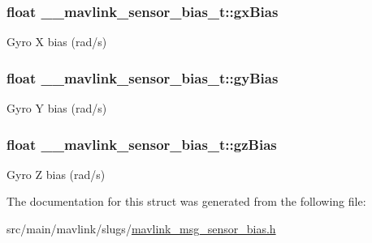 \hypertarget{struct____mavlink__sensor__bias__t_ad312d14ec67a812646702cb1af26e0a5}{
\subsubsection[{gx\+Bias}]{\setlength{\rightskip}{0pt plus 5cm}float \+\_\+\+\_\+mavlink\+\_\+sensor\+\_\+bias\+\_\+t\+::gx\+Bias}}\label{struct____mavlink__sensor__bias__t_ad312d14ec67a812646702cb1af26e0a5}


Gyro X bias (rad/s) 

\hypertarget{struct____mavlink__sensor__bias__t_a3c59d214cf6af8a1b0a7cfc38e593995}{
\subsubsection[{gy\+Bias}]{\setlength{\rightskip}{0pt plus 5cm}float \+\_\+\+\_\+mavlink\+\_\+sensor\+\_\+bias\+\_\+t\+::gy\+Bias}}\label{struct____mavlink__sensor__bias__t_a3c59d214cf6af8a1b0a7cfc38e593995}


Gyro Y bias (rad/s) 

\hypertarget{struct____mavlink__sensor__bias__t_af1973e90edcb27370fa54d23b6d56b10}{
\subsubsection[{gz\+Bias}]{\setlength{\rightskip}{0pt plus 5cm}float \+\_\+\+\_\+mavlink\+\_\+sensor\+\_\+bias\+\_\+t\+::gz\+Bias}}\label{struct____mavlink__sensor__bias__t_af1973e90edcb27370fa54d23b6d56b10}


Gyro Z bias (rad/s) 



The documentation for this struct was generated from the following file\+:\begin{DoxyCompactItemize}
\item 
src/main/mavlink/slugs/\hyperlink{mavlink__msg__sensor__bias_8h}{mavlink\+\_\+msg\+\_\+sensor\+\_\+bias.\+h}\end{DoxyCompactItemize}
